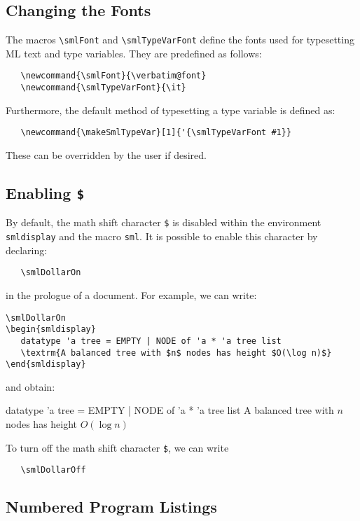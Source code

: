 \documentclass{article}
\begin{document}
\subsection{Changing the Fonts}
The macros \verb|\smlFont| and \verb|\smlTypeVarFont| 
define the fonts used for typesetting ML text and type variables.  
They are predefined as follows:
\begin{verbatim}
   \newcommand{\smlFont}{\verbatim@font}
   \newcommand{\smlTypeVarFont}{\it}
\end{verbatim}
Furthermore, the default method of typesetting a type variable
is defined as: 
\begin{verbatim}
   \newcommand{\makeSmlTypeVar}[1]{'{\smlTypeVarFont #1}}
\end{verbatim}
These can be overridden by the user if desired.

\subsection{Enabling {\tt \$}}
By default, the math shift character \verb|$| 
is disabled within the environment \verb|smldisplay|
and the macro \verb|sml|.  It is possible to
enable this character by declaring:
\begin{verbatim}
   \smlDollarOn
\end{verbatim}
\noindent in the prologue of a document.
For example, we can write:
\begin{verbatim}
\smlDollarOn
\begin{smldisplay}
   datatype 'a tree = EMPTY | NODE of 'a * 'a tree list
   \textrm{A balanced tree with $n$ nodes has height $O(\log n)$}
\end{smldisplay}
\end{verbatim}
and obtain:
\smlDollarOn
\begin{smldisplay}
   datatype 'a tree = EMPTY | NODE of 'a * 'a tree list
   \textrm{A balanced tree with $n$ nodes has height $O(\log n)$}
\end{smldisplay}

To turn off the math shift character \verb|$|, we can
write 
\begin{verbatim}
   \smlDollarOff
\end{verbatim}

\subsection{Numbered Program Listings}
\end{document}
